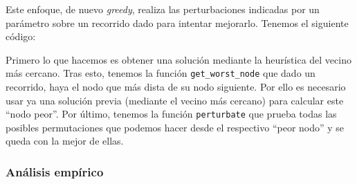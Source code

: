 \documentclass[10pt,a4paper]{article}
\begin{document}
Este enfoque, de nuevo \textit{greedy}, realiza las perturbaciones indicadas por un parámetro sobre un recorrido dado para intentar mejorarlo. Tenemos el siguiente código:


Primero lo que hacemos es obtener una solución mediante la heurística del vecino más cercano. Tras esto, tenemos la función \texttt{get\_worst\_node} que dado un recorrido, haya el nodo que más dista de su nodo siguiente. Por ello es necesario usar ya una solución previa (mediante el vecino más cercano) para calcular este ``nodo peor''. Por último, tenemos la función \texttt{perturbate} que prueba todas las posibles permutaciones que podemos hacer desde el respectivo ``peor nodo'' y se queda con la mejor de ellas.

\subsubsection*{Análisis empírico}
\end{document}
